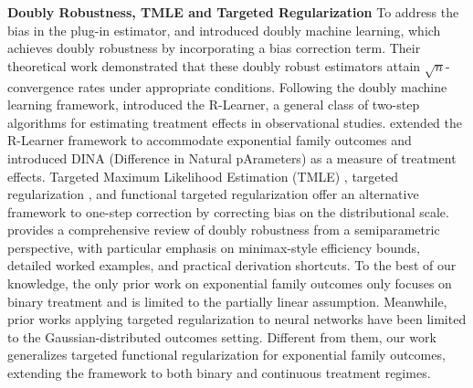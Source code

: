 \textbf{Doubly Robustness, TMLE and Targeted Regularization} To address the bias in the plug-in estimator, \cite{Chernozhukov2017} and \cite{Chernozhukov2018} introduced doubly machine learning, which achieves doubly robustness by incorporating a bias correction term. Their theoretical work demonstrated that these doubly robust estimators attain $\sqrt{n}$-convergence rates under appropriate conditions. 
Following the doubly machine learning framework, \cite{NieRLearner} introduced the R-Learner, a general class of two-step algorithms for estimating treatment effects in observational studies. \cite{gao2022estimatingheterogeneoustreatmenteffects} extended the R-Learner framework to accommodate exponential family outcomes and introduced DINA (Difference in Natural pArameters) as a measure of treatment effects. Targeted Maximum Likelihood Estimation (TMLE) \cite{van2011targeted}, targeted regularization \cite{shi2019adapting}, and functional targeted regularization \cite{nie2021vcnet} offer an alternative framework to one-step correction by correcting bias on the distributional scale. 
\cite{kennedy2023semiparametricdoublyrobusttargeted} provides a comprehensive review of doubly robustness from a semiparametric perspective, with particular emphasis on minimax-style efficiency bounds, detailed worked examples, and practical derivation shortcuts. 
To the best of our knowledge, 
the only prior work on exponential family outcomes \cite{gao2022estimatingheterogeneoustreatmenteffects} only focuses on binary treatment and is limited to the partially linear assumption. 
Meanwhile,
prior works applying targeted regularization to neural networks \cite{shi2019adapting, nie2021vcnet} have been limited to the Gaussian-distributed outcomes setting. 
Different from them,
our work generalizes targeted functional regularization for exponential family outcomes, extending the framework to both binary and continuous treatment regimes.